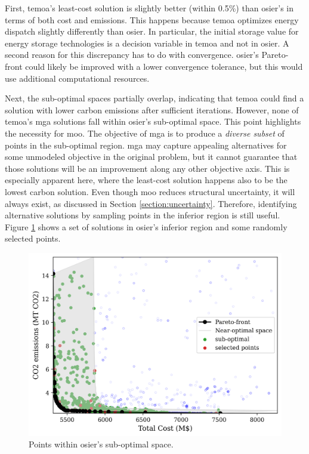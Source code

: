 First, \ac{temoa}'s least-cost solution is slightly better (within 0.5\%) than
\ac{osier}'s in terms of both cost and emissions. This happens because
\ac{temoa} optimizes energy dispatch slightly differently than \ac{osier}. In
particular, the initial storage value for energy storage technologies is a
decision variable in \ac{temoa} and not in \ac{osier}. A second reason for this
discrepancy has to do with convergence. \ac{osier}'s Pareto-front could likely
be improved with a lower convergence tolerance, but this would use additional
computational resources.

Next, the sub-optimal spaces partially overlap, indicating that \ac{temoa} could
find a solution with lower carbon emissions after sufficient iterations.
However, none of \ac{temoa}'s \ac{mga} solutions fall within \ac{osier}'s
sub-optimal space. This point highlights the necessity for \acl{moo}. The
objective of \ac{mga} is to produce a \textit{diverse subset} of points in the
sub-optimal region. \ac{mga} may capture appealing alternatives for some
unmodeled objective in the original problem, but it cannot guarantee that those
solutions will be an improvement along any other objective axis. This is
especially apparent here, where the least-cost solution happens also to be the
lowest carbon solution. Even though \ac{moo} reduces structural uncertainty, it
will always exist, as discussed in Section \ref{section:uncertainty}. Therefore,
identifying alternative solutions by sampling points in the inferior region is
still useful. Figure \ref{fig:temoa-benchmark-02} shows a set of solutions in
\ac{osier}'s inferior region and some randomly selected points.



\begin{figure}[h]
  \centering
  \includegraphics[width=0.6\columnwidth]{figures/results/osier_mga_subset_01.png}
  \caption{Points within \ac{osier}'s sub-optimal space.}
  \label{fig:temoa-benchmark-02}
\end{figure}

